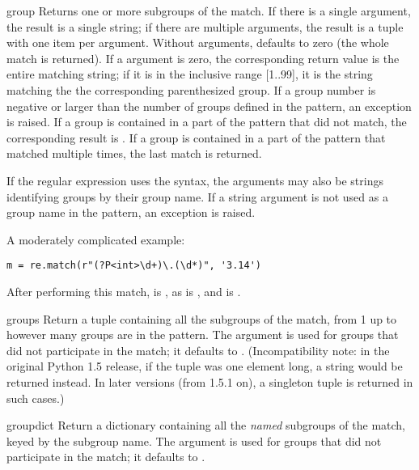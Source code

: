 \begin{methoddesc}[MatchObject]{group}{}
Returns one or more subgroups of the match.  If there is a single
argument, the result is a single string; if there are
multiple arguments, the result is a tuple with one item per argument.
Without arguments,  defaults to zero (the whole match
is returned).
If a  argument is zero, the corresponding return value is the
entire matching string; if it is in the inclusive range [1..99], it is
the string matching the the corresponding parenthesized group.  If a
group number is negative or larger than the number of groups defined
in the pattern, an  exception is raised.
If a group is contained in a part of the pattern that did not match,
the corresponding result is .  If a group is contained in a
part of the pattern that matched multiple times, the last match is
returned.

If the regular expression uses the  syntax,
the  arguments may also be strings identifying groups by
their group name.  If a string argument is not used as a group name in
the pattern, an  exception is raised.

A moderately complicated example:

\begin{verbatim}
m = re.match(r"(?P<int>\d+)\.(\d*)", '3.14')
\end{verbatim}

After performing this match,  is , as is
, and  is .
\end{methoddesc}

\begin{methoddesc}[MatchObject]{groups}{}
Return a tuple containing all the subgroups of the match, from 1 up to
however many groups are in the pattern.  The  argument is
used for groups that did not participate in the match; it defaults to
.  (Incompatibility note: in the original Python 1.5
release, if the tuple was one element long, a string would be returned
instead.  In later versions (from 1.5.1 on), a singleton tuple is
returned in such cases.)
\end{methoddesc}

\begin{methoddesc}[MatchObject]{groupdict}{}
Return a dictionary containing all the \emph{named} subgroups of the
match, keyed by the subgroup name.  The  argument is
used for groups that did not participate in the match; it defaults to
.
\end{methoddesc}

